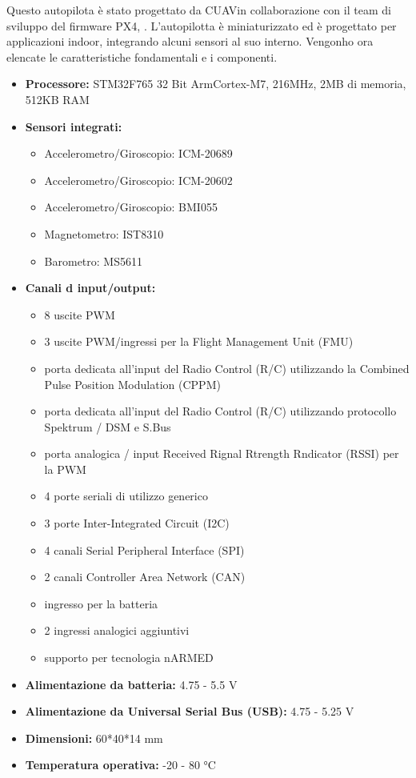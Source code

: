 Questo autopilota è stato progettato da CUAV\textregistered in collaborazione con il team di sviluppo del firmware PX4, \cite{CUAV}. L'autopilotta è miniaturizzato ed è progettato per applicazioni indoor, integrando alcuni sensori al suo interno.
Vengonho ora elencate le caratteristiche fondamentali e i componenti.
\begin{itemize}
	\item \textbf{Processore:} STM32F765 32 Bit Arm\textregistered Cortex\textregistered-M7, 216MHz, 2MB di memoria, 512KB RAM
	\item \textbf{Sensori integrati:} 
		\begin{itemize}
			\item Accelerometro/Giroscopio: ICM-20689
			\item Accelerometro/Giroscopio: ICM-20602
			\item Accelerometro/Giroscopio: BMI055
			\item Magnetometro: IST8310
			\item Barometro: MS5611
		\end{itemize}
	\item \textbf{Canali d input/output:}
		\begin{itemize}
			\item 8 uscite PWM
			\item 3 uscite PWM/ingressi per la Flight Management Unit (FMU)
			\item porta dedicata all'input del Radio Control (R/C) utilizzando la Combined Pulse Position Modulation (CPPM)
			\item porta dedicata all'input del Radio Control (R/C) utilizzando protocollo Spektrum / DSM e S.Bus
			\item porta analogica / input Received Rignal Rtrength Rndicator (RSSI) per la PWM
			\item 4 porte seriali di utilizzo generico
			\item 3 porte Inter-Integrated Circuit (I2C)
			\item 4 canali Serial Peripheral Interface (SPI) 
			\item 2 canali Controller Area Network (CAN)
			\item ingresso per la batteria
			\item 2 ingressi analogici aggiuntivi
			\item supporto per tecnologia nARMED
		\end{itemize}
	\item \textbf{Alimentazione da batteria:} 4.75 - 5.5 V
	\item \textbf{Alimentazione da Universal Serial Bus (USB):} 4.75 - 5.25 V
	\item \textbf{Dimensioni:} 60*40*14 mm
	\item \textbf{Temperatura operativa:} -20 - 80 °C

\end{itemize}



